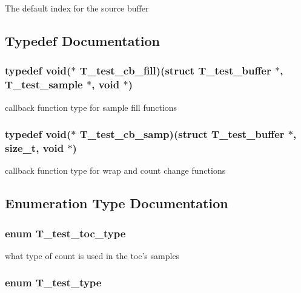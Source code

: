 The default index for the source buffer 

\subsection{Typedef Documentation}
\subsubsection{\setlength{\rightskip}{0pt plus 5cm}typedef void($\ast$ T\_\-test\_\-cb\_\-fill)(struct {\bf T\_\-test\_\-buffer} $\ast$, {\bf T\_\-test\_\-sample} $\ast$, void $\ast$)}\label{test__utils_8h_a20}


callback function type for sample fill functions 
\subsubsection{\setlength{\rightskip}{0pt plus 5cm}typedef void($\ast$ T\_\-test\_\-cb\_\-samp)(struct {\bf T\_\-test\_\-buffer} $\ast$, size\_\-t, void $\ast$)}\label{test__utils_8h_a19}


callback function type for wrap and count change functions 

\subsection{Enumeration Type Documentation}
\subsubsection{\setlength{\rightskip}{0pt plus 5cm}enum T\_\-test\_\-toc\_\-type}\label{test__utils_8h_a54}


what type of count is used in the toc's samples 
\subsubsection{\setlength{\rightskip}{0pt plus 5cm}enum T\_\-test\_\-type}\label{test__utils_8h_a53}


